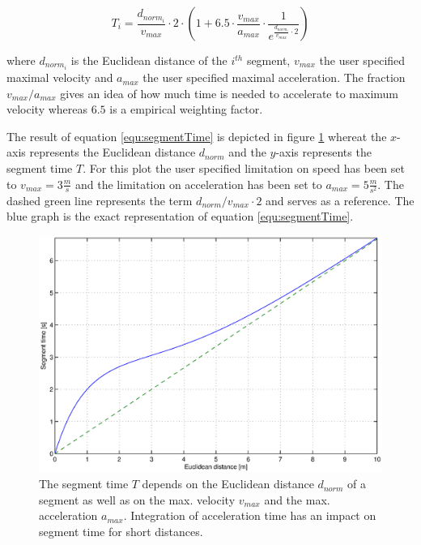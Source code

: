 \begin{equation}
T_i = \frac{d_{norm_i}}{v_{max}} \cdot 2 \cdot \left( 1 + 6.5 \cdot \frac {v_{max}}{a_{max}} \cdot \frac{1}{e^{\frac{d_{norm_i}}{v_{max}} \cdot 2}} \right)
\label{equ:segmentTime}
\end{equation}

where $d_{norm_i}$ is the Euclidean distance of the $i^{th}$ segment, $v_{max}$ the user specified maximal velocity and $a_{max}$ the user specified maximal acceleration. The fraction $v_{max}/a_{max}$ gives an idea of how much time is needed to accelerate to maximum velocity whereas $6.5$ is a empirical weighting factor. \newline

The result of equation \ref{equ:segmentTime} is depicted in figure \ref{pic:timeEstimation} whereat the $x$-axis represents the Euclidean distance $d_{norm}$ and the $y$-axis represents the segment time $T$. For this plot the user specified limitation on speed has been set to $v_{max} = 3 \frac{m}{s}$  and the limitation on acceleration has been set to  $a_{max} = 5 \frac{m}{s^2}$. The dashed green line represents the term $d_{norm}/v_{max} \cdot 2$ and serves as a reference. The blue graph is the exact representation of equation \ref{equ:segmentTime}. 

\begin{figure}[H]
   \centering
   \includegraphics[trim = 20mm 10mm 20mm 10mm,width=1\textwidth]{pics/time_estimation.eps}
   \caption{The segment time $T$ depends on the Euclidean distance $d_{norm}$ of a segment as well as on the max. velocity $v_{max}$ and the max. acceleration $a_{max}$. Integration of acceleration time has an impact on segment time for short distances.}
   \label{pic:timeEstimation}
\end{figure}

